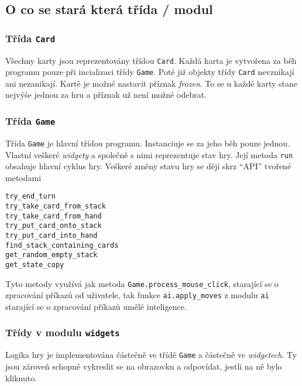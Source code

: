 \documentclass{article}
\begin{document}
\subsection*{O co se stará která třída / modul}

\subsubsection*{Třída \texttt{Card}}

Všechny karty jsou reprezentovány třídou \texttt{Card}. Každá karta je
vytvořena za běh programu pouze při incializaci třídy \texttt{Game}. Poté již
objekty třídy \texttt{Card} nevznikají ani nezanikají. Kartě je možné nastavit
příznak \emph{frozen}. To se u každé karty stane nejvýše jednou za hru a
příznak už není možné odebrat.

\subsubsection*{Třída \texttt{Game}}

Třída \texttt{Game} je hlavní třídou programu. Instanciuje se za jeho běh pouze
jednou. Vlastní veškeré \emph{widgety} a společně s nimi reprezentuje stav hry.
Její metoda \texttt{run} obsahuje hlavní cyklus hry. Veškeré změny stavu hry se
dějí skrz \enquote{API} tvořené metodami
\begin{verbatim}
try_end_turn
try_take_card_from_stack
try_take_card_from_hand
try_put_card_onto_stack
try_put_card_into_hand
find_stack_containing_cards
get_random_empty_stack
get_state_copy
\end{verbatim}
Tyto metody využívá jak metoda \texttt{Game.process\_mouse\_click}, starající
se o zpracování příkazů od uživatele, tak funkce \texttt{ai.apply\_moves} z
modulu \texttt{ai} starající se o zpracování příkazů umělé inteligence.

\subsubsection*{Třídy v modulu \texttt{widgets}}

Logika hry je implementována částečně ve třídě \texttt{Game} a částečně ve
\emph{widgetech}. Ty jsou zároveň schopné vykreslit se na obrazovku a
odpovídat, jestli na ně bylo kliknuto.
\end{document}
